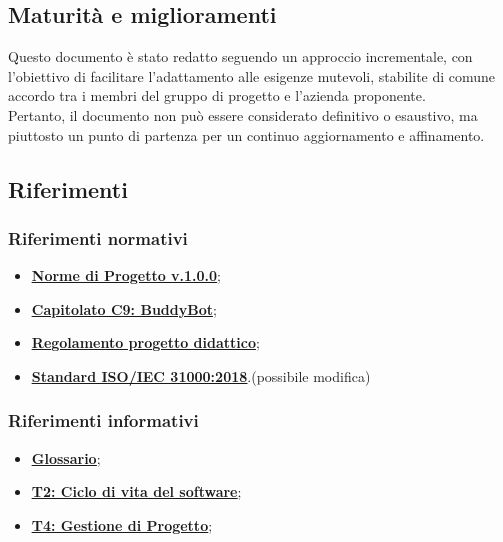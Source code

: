\subsection{Maturità e miglioramenti}
Questo documento è stato redatto seguendo un approccio incrementale, con l'obiettivo di facilitare l'adattamento alle esigenze mutevoli, stabilite di comune accordo tra i membri del gruppo di progetto e l'azienda proponente.\\
Pertanto, il documento non può essere considerato definitivo o esaustivo, ma piuttosto un punto di partenza per un continuo aggiornamento e affinamento.

\subsection{Riferimenti}
\subsubsection{Riferimenti normativi}
\begin{itemize}
    \item \href{https://sweg-labs.github.io/Documentazione/output/RTB/Documentazione%20interna/norme_progetto_v1.0.0.pdf}{\underline{\textbf{Norme di Progetto v.1.0.0}}};\\
    \item \href{https://www.math.unipd.it/~tullio/IS-1/2024/Progetto/C9.pdf}{\underline{\textbf{Capitolato C9: BuddyBot}}}; \\
    \item \href{https://www.math.unipd.it/~tullio/IS-1/2024/Dispense/PD1.pdf}{\underline{\textbf{Regolamento progetto didattico}}};\\
    \item \href{https://www.iso.org/standard/65694.html}{\underline{\textbf{Standard ISO/IEC 31000:2018}}}.(possibile modifica)
\end{itemize}

\subsubsection{Riferimenti informativi}
\begin{itemize}
    \item \href{https://sweg-labs.github.io/Documentazione/output/RTB/Documentazione%20esterna/glossario_v1.0.0.pdf}{\underline{\textbf{Glossario}}};\\
    \item \href{https://www.math.unipd.it/~tullio/IS-1/2024/Dispense/T02.pdf}{\underline{\textbf{T2: Ciclo di vita del software}}}; \\
    \item \href{https://www.math.unipd.it/~tullio/IS-1/2024/Dispense/T04.pdf}{\underline{\textbf{T4: Gestione di Progetto}}};\\
\end{itemize}
